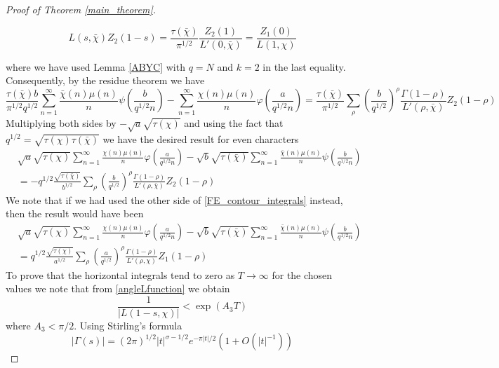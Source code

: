 \documentclass[11pt]{article}
\numberwithin{equation}{section}		 			%
\numberwithin{figure}{section}			 			%
\begin{document}
\begin{proof}[Proof of Theorem \eqref{main_theorem}]
\begin{itemize}
\[{{L(s,\bar \chi )}}Z_2 (1 - s) = \frac{{\tau (\bar \chi )}}
{{\pi ^{1/2} }}\frac{{Z_2 (1)}}
{{L'(0,\bar \chi )}} = \frac{{Z_1 (0)}}
{{L(1,\chi )}}
\]
\end{itemize}
where we have used Lemma \eqref{ABYC} with $q=N$ and $k=2$ in the last equality. Consequently, by the residue theorem we have
\[
\frac{{\tau (\bar \chi )b}}
{{\pi ^{1/2} q^{1/2} }}\sum\limits_{n = 1}^\infty  {\frac{{\bar \chi (n)\mu (n)}}
{n}\psi \left( {\frac{b}
{{q^{1/2} n}}} \right)}  - \sum\limits_{n = 1}^\infty  {\frac{{\chi (n)\mu (n)}}
{n}\varphi \left( {\frac{a}
{{q^{1/2} n}}} \right)}  = \frac{{\tau (\bar \chi )}}
{{\pi ^{1/2} }}\sum\limits_\rho  {\left( {\frac{b}
{{q^{1/2} }}} \right)^\rho  \frac{{\Gamma (1 - \rho )}}
{{L'(\rho ,\bar \chi )}}Z_2 (1 - \rho )} 
\]
Multiplying both sides by $- \sqrt a \sqrt {\tau (\chi )}$ and using the fact that $q^{1/2}  = \sqrt {\tau (\chi )\tau (\bar \chi )}$ we have the desired result for even characters
\begin{align}
& \sqrt a \sqrt {\tau (\chi )} \sum\limits_{n = 1}^\infty  {\frac{{\chi (n)\mu (n)}}
{n}\varphi \left( {\frac{a}
{{q^{1/2} n}}} \right)}  - \sqrt b \sqrt {\tau (\bar \chi )} \sum\limits_{n = 1}^\infty  {\frac{{\bar \chi (n)\mu (n)}}
{n}\psi \left( {\frac{b}
{{q^{1/2} n}}} \right)} \nonumber \\
&=  - q^{1/2} \frac{{\sqrt {\tau (\bar \chi )} }}
{{b^{1/2} }}\sum\limits_\rho  {\left( {\frac{b}
{{q^{1/2} }}} \right)^\rho  \frac{{\Gamma (1 - \rho )}}
{{L'(\rho ,\bar \chi )}}Z_2 (1 - \rho )}
\end{align}
We note that if we had used the other side of \eqref{FE_contour_integrals} instead, then the result would have been
\begin{align}
&\sqrt a \sqrt {\tau (\chi )} \sum\limits_{n = 1}^\infty  {\frac{{\chi (n)\mu (n)}}
{n}\varphi \left( {\frac{a}
{{q^{1/2} n}}} \right)}  - \sqrt b \sqrt {\tau (\bar \chi )} \sum\limits_{n = 1}^\infty  {\frac{{\bar \chi (n)\mu (n)}}
{n}\psi \left( {\frac{b}
{{q^{1/2} n}}} \right)} \nonumber \\
&= q^{1/2} \frac{{\sqrt {\tau ( \chi )} }}
{{a^{1/2} }}\sum\limits_\rho  {\left( {\frac{a}
{{q^{1/2} }}} \right)^\rho  \frac{{\Gamma (1 - \rho )}}
{{L'(\rho , \chi )}}Z_1 (1 - \rho )} 
\end{align}
To prove that the horizontal integrals tend to zero as $T \to \infty$ for the chosen values we note that from \eqref{angleLfunction} we obtain
\[
\frac{1}{{\left| {L(1 - s,\chi )} \right|}} < \exp (A_3 T)
\]
where $A_3 < \pi/2$. Using Stirling's formula
\[
\left| {\Gamma (s)} \right| = (2\pi )^{1/2} \left| t \right|^{\sigma  - 1/2} e^{ - \pi \left| t \right|/2} (1 + O(\left| t \right|^{ - 1} ))
\]
\end{proof}
\end{document}
